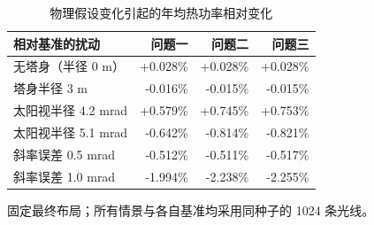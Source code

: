 \begin{table}[htbp]
\centering\small
\caption{物理假设变化引起的年均热功率相对变化}\label{tab:sensitivity}
\begin{tabular}{lrrr}
\toprule
相对基准的扰动 & 问题一 & 问题二 & 问题三\\\midrule
无塔身（半径 0 m） & +0.028\% & +0.028\% & +0.028\%\\
塔身半径 3 m & -0.016\% & -0.015\% & -0.015\%\\
太阳视半径 4.2 mrad & +0.579\% & +0.745\% & +0.753\%\\
太阳视半径 5.1 mrad & -0.642\% & -0.814\% & -0.821\%\\
斜率误差 0.5 mrad & -0.512\% & -0.511\% & -0.517\%\\
斜率误差 1.0 mrad & -1.994\% & -2.238\% & -2.255\%\\
\bottomrule
\end{tabular}
\par\vspace{3pt}\begin{minipage}{.95\linewidth}\footnotesize 固定最终布局；所有情景与各自基准均采用同种子的 1024 条光线。\end{minipage}
\end{table}
